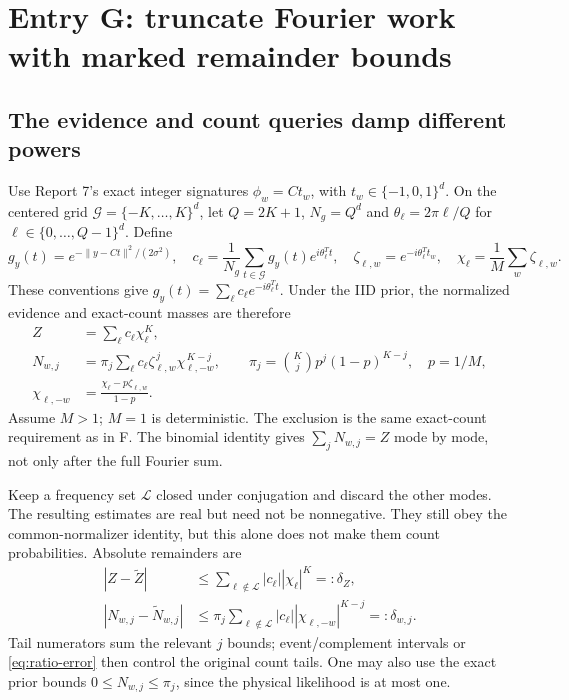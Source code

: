 \documentclass[10pt,a4paper]{article}
\begin{document}
\section{Entry G: truncate Fourier work with marked remainder bounds}
\label{sec:fourier-approximation}
\subsection{The evidence and count queries damp different powers}
Use Report 7's exact integer signatures $\phi_w=Ct_w$, with $t_w\in\{-1,0,1\}^d$.
On the centered grid $\mathcal G=\{-K,\ldots,K\}^d$, let $Q=2K+1$, $N_g=Q^d$ and
$\theta_\ell=2\pi\ell/Q$ for $\ell\in\{0,\ldots,Q-1\}^d$. Define
\[
 g_y(t)=e^{-\|y-Ct\|^2/(2\sigma^2)},\quad
 c_\ell=\frac1{N_g}\sum_{t\in\mathcal G}g_y(t)e^{i\theta_\ell^Tt},\quad
 \zeta_{\ell,w}=e^{-i\theta_\ell^Tt_w},\quad
 \chi_\ell=\frac1M\sum_w\zeta_{\ell,w}.
\]
These conventions give $g_y(t)=\sum_\ell c_\ell e^{-i\theta_\ell^Tt}$. Under the IID prior,
the normalized evidence and exact-count masses are therefore
\begin{align}
 Z&=\sum_\ell c_\ell\chi_\ell^K,\\
 N_{w,j}&=\pi_j\sum_\ell c_\ell\zeta_{\ell,w}^{\,j}
                     \chi_{\ell,-w}^{\,K-j},\qquad
 \pi_j=\binom Kj p^j(1-p)^{K-j},\quad p=1/M,\\
 \chi_{\ell,-w}&=\frac{\chi_\ell-p\zeta_{\ell,w}}{1-p}.
 \label{eq:fourier-marked-powers}
\end{align}
Assume $M>1$; $M=1$ is deterministic. The exclusion is the same exact-count requirement as in F.
The binomial identity gives $\sum_j N_{w,j}=Z$ mode by mode, not only after the full Fourier sum.

Keep a frequency set $\mathcal L$ closed under conjugation and discard the other modes. The resulting
estimates are real but need not be nonnegative. They still obey the common-normalizer identity, but this
alone does not make them count probabilities. Absolute remainders are
\begin{align}
 |Z-\widetilde Z|&\leq
       \sum_{\ell\notin\mathcal L}|c_\ell||\chi_\ell|^K=:\delta_Z,\\
 |N_{w,j}-\widetilde N_{w,j}|&\leq
       \pi_j\sum_{\ell\notin\mathcal L}|c_\ell|
                 |\chi_{\ell,-w}|^{K-j}=:\delta_{w,j}.
 \label{eq:fourier-marked-remainder}
\end{align}
Tail numerators sum the relevant $j$ bounds; event/complement intervals or
\eqref{eq:ratio-error} then control the original count tails. One may also use the exact prior bounds
$0\leq N_{w,j}\leq\pi_j$, since the physical likelihood is at most one.
\end{document}
